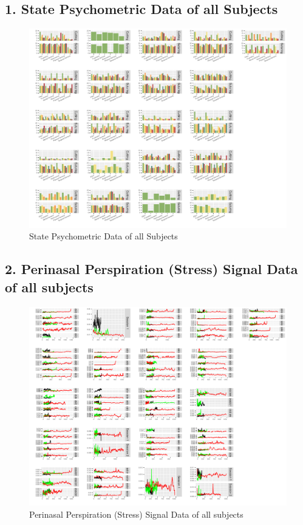 \documentclass[12pt,epsf]{report}
\begin{document}
{\subsection*{1. State Psychometric Data of all Subjects}
\begin{figure}[!htb]
	\centering
	\includegraphics[width=1.0\textwidth]{multiplot_state_psycho.pdf}
	\caption{State Psychometric Data of all Subjects}
	\centering
\end{figure}
\FloatBarrier
\subsection*{2. Perinasal Perspiration (Stress) Signal Data of all subjects}
\begin{figure}[!htb]
	\centering
	\includegraphics[width=1.0\textwidth]{multiplot_perinasal_percep.pdf}
	\caption{Perinasal Perspiration (Stress) Signal Data of all subjects}
	\centering
\end{figure}
\FloatBarrier
}
\end{document}

